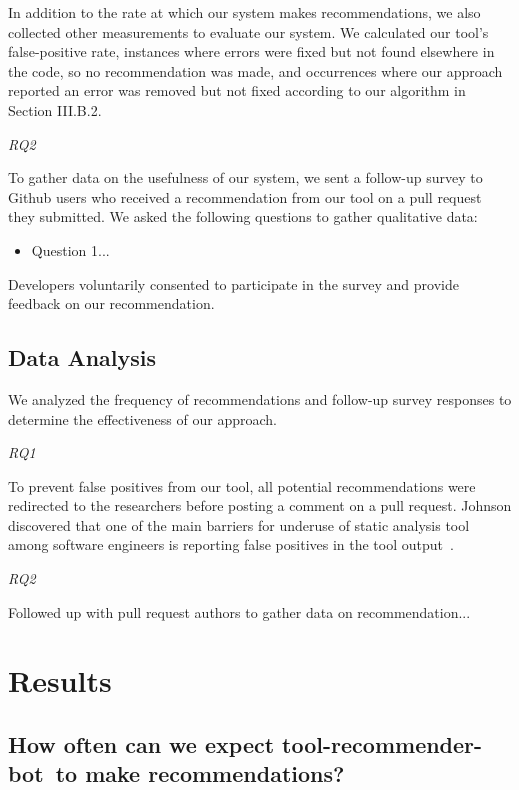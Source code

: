 \documentclass[conference]{IEEEtran}
\newcommand{\tool}{tool-recommender-bot}
\newcommand{\pseudosubsection}[1]{\vspace{2mm} {\it #1}}
\begin{document}
In addition to the rate at which our system makes recommendations, we also collected other measurements to evaluate our system. We calculated our tool's false-positive rate, instances where errors were fixed but not found elsewhere in the code, so no recommendation was made, and occurrences where our approach reported an error was removed but not fixed according to our algorithm in Section III.B.2.

\pseudosubsection{RQ2}

To gather data on the usefulness of our system, we sent a follow-up survey to Github users who received a recommendation from our tool on a pull request they submitted. We asked the following questions to gather qualitative data:

\begin{itemize}
\item Question 1...
\end{itemize}

Developers voluntarily consented to participate in the survey and provide feedback on our recommendation.

\subsection{Data Analysis}

We analyzed the frequency of recommendations and follow-up survey responses to determine the effectiveness of our approach.

\pseudosubsection{RQ1}

To prevent false positives from our tool, all potential recommendations were redirected to the researchers before posting a comment on a pull request. Johnson discovered that one of the main barriers for underuse of static analysis tool among software engineers is reporting false positives in the tool output~\cite{Johnson2013Why}.

\pseudosubsection{RQ2}

Followed up with pull request authors to gather data on recommendation...

\section{Results}

\subsection{How often can we expect \tool~to make recommendations?}
\end{document}
